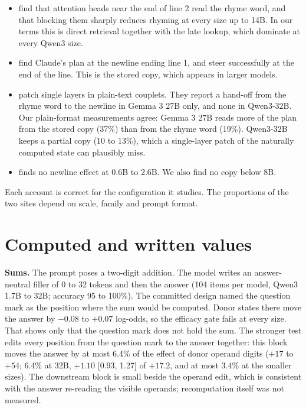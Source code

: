 \documentclass[
]{article}
\newcounter{none} %
\providecommand{\tightlist}{%
  \setlength{\itemsep}{0pt}\setlength{\parskip}{0pt}}
\begin{document}
\begin{itemize}
\tightlist
\item
  \citet{hanna2026latent} find that attention heads near the end of line
  2 read the rhyme word, and that blocking them sharply reduces rhyming
  at every size up to 14B. In our terms this is direct retrieval
  together with the late lookup, which dominate at every Qwen3 size.
\item
  \citet{lindsey2025biology} find Claude's plan at the newline ending
  line 1, and \citet{maar2026plan} steer successfully at the end of the
  line. This is the stored copy, which appears in larger models.
\item
  \citet{ma2026plan} patch single layers in plain-text couplets. They
  report a hand-off from the rhyme word to the newline in Gemma 3 27B
  only, and none in Qwen3-32B. Our plain-format measurements agree:
  Gemma 3 27B reads more of the plan from the stored copy (37\%) than
  from the rhyme word (19\%). Qwen3-32B keeps a partial copy (10 to
  13\%), which a single-layer patch of the naturally computed state can
  plausibly miss.
\item
  \citet{jacopin2026improvisation} finds no newline effect at 0.6B to
  2.6B. We also find no copy below 8B.
\end{itemize}

Each account is correct for the configuration it studies. The
proportions of the two sites depend on scale, family and prompt format.

\section{Computed and written values}\label{sec-app-computed}

\textbf{Sums.} The prompt poses a two-digit addition. The model writes
an answer-neutral filler of 0 to 32 tokens and then the answer (104
items per model, Qwen3 1.7B to 32B; accuracy 95 to 100\%). The committed
design named the question mark as the position where the sum would be
computed. Donor states there move the answer by \(-0.08\) to \(+0.07\)
log-odds, so the efficacy gate fails at every size. That shows only that
the question mark does not hold the sum. The stronger test edits every
position from the question mark to the answer together: this block moves
the answer by at most 6.4\% of the effect of donor operand digits
(\(+17\) to \(+54\); 6.4\% at 32B, \(+1.10\) {[}0.93, 1.27{]} of
\(+17.2\), and at most 3.4\% at the smaller sizes). The downstream block
is small beside the operand edit, which is consistent with the answer
re-reading the visible operands; recomputation itself was not measured.
\end{document}

